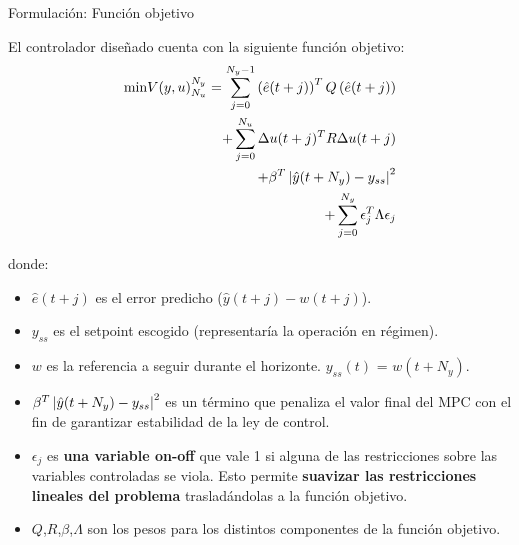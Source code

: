 \documentclass{beamer}
\begin{document}
\begin{myFrame}{Formulación: Función objetivo}

El controlador diseñado cuenta con la siguiente función objetivo:
\begin{equation}\label{eq:FO_MPC_RF}
\begin{split}
\text{min} V(y,u)^{N_y}_{N_u} = \sum_{j = 0}^{N_y-1}\left( \hat{e}(t+j) \right)^TQ\left( \hat{e}(t+j) \right)\\
+\sum_{j = 0}^{N_u}\Delta u(t+j)^TR\Delta u(t+j)\\
+\beta^T\left\lvert \hat{y}(t+N_y)-y_{ss} \right\rvert^2\\
+\sum_{j = 0}^{N_y}\epsilon_j^T\Lambda\epsilon_j
\end{split}
\end{equation}

\framebreak

donde:
\begin{itemize}
\item $\hat{e}(t+j)$ es el error predicho ($\hat{y}(t+j)-w(t+j)$).
\item $y_{ss}$ es el setpoint escogido (representaría la operación en régimen).
\item $w$ es la referencia a seguir durante el horizonte. $y_{ss}(t)$ = $w(t+N_y)$.
\item $\beta^T\left\lvert \hat{y}(t+N_y)-y_{ss} \right\rvert^2$ es un término que penaliza el valor final del MPC con el fin de garantizar estabilidad de la ley de control.
\item $\epsilon_j$ es \textbf{una variable on-off} que vale 1 si alguna de las restricciones sobre las variables controladas se viola. Esto permite \textbf{suavizar las restricciones lineales del problema} trasladándolas a la función objetivo.
\item $Q$,$R$,$\beta$,$\Lambda$ son los pesos para los distintos componentes de la función objetivo.
\end{itemize}
\end{myFrame}
\end{document}
